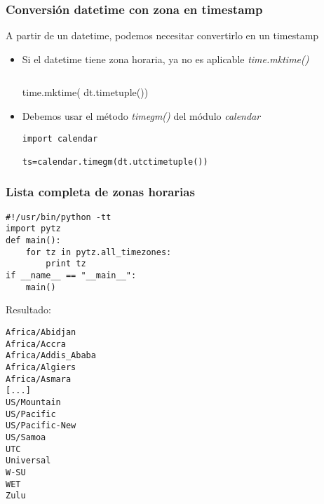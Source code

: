 \documentclass[ucs]{beamer}
\begin{document}
\begin{frame}[fragile]
\frametitle{Conversión datetime con zona en timestamp}
A partir de un datetime, podemos necesitar convertirlo en un timestamp
\begin{itemize}
\item
Si el datetime tiene zona horaria, ya no es aplicable \emph{time.mktime()}
  \begin{footnotesize}
  \begin{verbatim}
  \end{verbatim}
time.mktime( dt.timetuple())
  \end{footnotesize}

\item
Debemos usar el método \emph{timegm()} del módulo \emph{calendar}

  \begin{footnotesize}
  \begin{verbatim}
import calendar 

ts=calendar.timegm(dt.utctimetuple())
  \end{verbatim}
  \end{footnotesize}


\end{itemize}

\end{frame}



\begin{frame}[fragile]
\frametitle{Lista completa de zonas horarias}

  \begin{footnotesize}
  \begin{verbatim}
#!/usr/bin/python -tt
import pytz
def main():
    for tz in pytz.all_timezones:
        print tz
if __name__ == "__main__":
    main()
  \end{verbatim}
  \end{footnotesize}

Resultado:
  \begin{tiny}
  \begin{verbatim}
Africa/Abidjan
Africa/Accra
Africa/Addis_Ababa
Africa/Algiers
Africa/Asmara
[...]
US/Mountain
US/Pacific
US/Pacific-New
US/Samoa
UTC
Universal
W-SU
WET
Zulu
  \end{verbatim}
  \end{tiny}

\end{frame}
\end{document}
